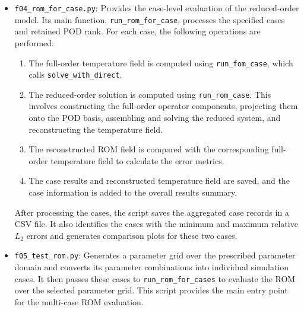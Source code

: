 \begin{itemize}
\begin{itemize}
        \item \texttt{run\_reduced\_model}: Coordinates the
        reduced-order calculation for a specified number of
        POD modes and parameter combination. It invokes the
        reduced-system construction, solution, and
        reconstruction routines, and saves the modal
        coefficients, reduced system, and reconstructed
        temperature field.
    \end{itemize}

    \item \texttt{f04\_rom\_for\_case.py}: Provides the
    case-level evaluation of the reduced-order model. Its
    main function, \texttt{run\_rom\_for\_case}, processes
    the specified cases and retained POD rank. For each
    case, the following operations are performed:

    \begin{enumerate}
        \item The full-order temperature field is computed
        using \texttt{run\_fom\_case}, which calls
        \texttt{solve\_with\_direct}.

        \item The reduced-order solution is computed using
        \texttt{run\_rom\_case}. This involves constructing
        the full-order operator components, projecting them
        onto the POD basis, assembling and solving the
        reduced system, and reconstructing the temperature
        field.

        \item The reconstructed ROM field is compared with
        the corresponding full-order temperature field to
        calculate the error metrics.

        \item The case results and reconstructed temperature
        field are saved, and the case information is added
        to the overall results summary.
    \end{enumerate}

    After processing the cases, the script saves the
    aggregated case records in a CSV file. It also identifies
    the cases with the minimum and maximum relative
    $L_2$ errors and generates comparison plots for these
    two cases.

    \item \texttt{f05\_test\_rom.py}: Generates a parameter
    grid over the prescribed parameter domain and converts
    its parameter combinations into individual simulation
    cases. It then passes these cases to
    \texttt{run\_rom\_for\_cases} to evaluate the ROM over
    the selected parameter grid. This script provides the
    main entry point for the multi-case ROM evaluation.

\end{itemize}

